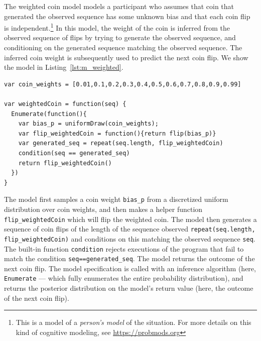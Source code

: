 \documentclass{article}
\begin{document}
The weighted coin model models a participant who assumes that coin that generated the observed sequence has some unknown bias and that each coin flip is independent.\footnote{This is a model of a \emph{person's model} of the situation. For more details on this kind of cognitive modeling, see \url{https://probmods.org}}
In this model, the weight of the coin is inferred from the observed sequence of flips by trying to generate the observed sequence, and conditioning on the generated sequence matching the observed sequence.
The inferred coin weight is subsequently used to predict the next coin flip. We show the model in Listing~\ref{lst:m_weighted}.

\begin{lstlisting}[caption=Biased coin model,  label={lst:m_weighted}]
var coin_weights = [0.01,0.1,0.2,0.3,0.4,0.5,0.6,0.7,0.8,0.9,0.99]

var weightedCoin = function(seq) {
  Enumerate(function(){
    var bias_p = uniformDraw(coin_weights);
    var flip_weightedCoin = function(){return flip(bias_p)}
    var generated_seq = repeat(seq.length, flip_weightedCoin)
    condition(seq == generated_seq)
    return flip_weightedCoin()
  })
}
\end{lstlisting}

%
The model first samples a coin weight \lstinline{bias_p} from a discretized uniform distribution over coin weights, and
then makes a helper function \lstinline{flip_weightedCoin} which will flip the weighted coin.
The model then generates a sequence of coin flips of the length of the sequence observed \lstinline{repeat(seq.length, flip_weightedCoin)} and conditions on this matching the observed sequence \lstinline{seq}.
The built-in function \lstinline{condition} rejects executions of the program that fail to match the condition \lstinline{seq==generated_seq}.
The model returns the outcome of the next coin flip.
The model specification is called with an inference algorithm (here, \lstinline{Enumerate} --- which fully enumerates the entire probability distribution), and returns the posterior distribution on the model's return value (here, the outcome of the next coin flip).
\end{document}
